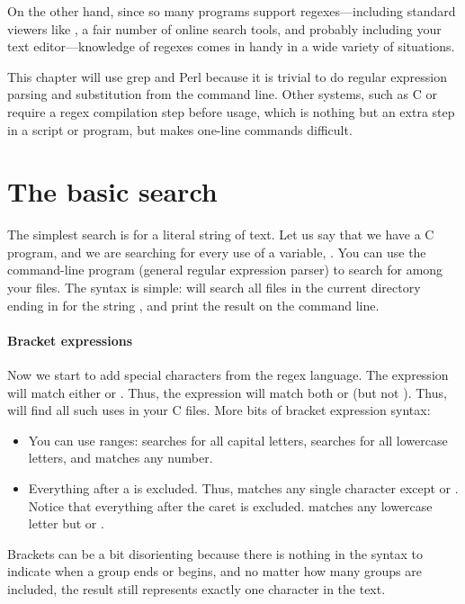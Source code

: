 On the other hand, since so many programs support regexes---including
standard viewers like , a fair number of online search tools,
and probably including your text editor---knowledge of regexes comes in
handy in a wide variety of situations.

This chapter will use grep and Perl because it is trivial to do regular
expression parsing and substitution from the command line. Other
systems, such as C or  require a regex compilation step
before usage, which is nothing but an extra step in a script or program,
but makes one-line commands difficult.

\section{The basic search}
The simplest search is for a literal string of text. Let us say that we
have a C program, and we are searching for every use of a variable,
. You can use the command-line program  (general
regular expression parser) to search for  among your files. The
syntax is simple:  will search all files in the current
directory ending in  for the string , and print the result
on the command line.


\paragraph{Bracket expressions} Now we start to add special characters
from the regex language. The expression \ci{[fs]} will match either
 or . Thus, the expression  will match both
 or  (but not ). Thus,  will find all such uses in your C files. More bits of
bracket expression syntax:

\begin{itemize}
\item You can use ranges: \ci{[A-Z]} searches for all capital letters,
\ci{[A-Za-z]} searches for all lowercase letters, and \ci{[0-9]} matches
any number. 
\item Everything after a \ci{\that} is excluded. Thus, \ci{[\that{}fs]} matches
any single character except  or . Notice that everything
after the caret is excluded. \ci{[a-z\that{}fs]} matches any lowercase letter
but  or .
\end{itemize}
Brackets can be a bit disorienting because there is nothing in the syntax
to indicate when a group ends or begins, and no matter how many groups are
included, the result still represents exactly one character in the text.

